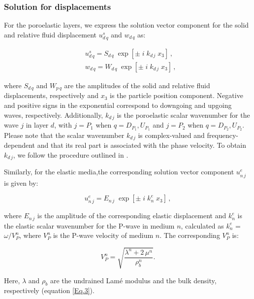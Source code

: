 \documentclass[draft]{agujournal2019}
\begin{document}
\subsubsection{Solution for displacements}
For the poro\-elastic layers, we express the solution vector component for the solid and relative fluid displacement $u_{d\,q}^s$ and $w_{d\, q}$ as:
\begin{linenomath*}
\begin{equation}\label{Eq.10}
\begin{split}
& u_{d\,q}^s = S_{d\, q}\;\exp[ \pm \; i \; k_{d \,j} \; x_3 ] \, ,\\
& w_{d \,q} = W_{d\,q}\;\exp[\pm \; i\;  k_{d\,j} \;x_3 ] \, ,
\end{split}
\end{equation}
\end{linenomath*}
where $ S_{d\, q}$ and $W_{p\,q}$
are the amplitudes of the solid and relative fluid displacements, respectively and $x_3$ is the particle position component. Negative and positive signs in the exponential correspond to downgoing and upgoing waves, respectively. Additionally, 
$ k_{d\,j}$ is the poroelastic scalar wave\-number for the wave $j$ in layer $d$, with $j=P_1$ when $q=D_{P_1},U_{P_1}$ and $j=P_2$ when $q=D_{P_2},U_{P_2}$. Please note that the scalar wave\-number $ k_{d\,j}$ is complex-valued and frequency-dependent and that its real part is associated with the phase velocity. To obtain
$ k_{d\,j}$, we follow the procedure outlined in .

Similarly, for the elastic media,the corresponding solution vector component $u_{n\,j}^e$ is given by:
\begin{linenomath*}
\begin{equation}\label{Eq.11}
u_{n\,j}^e = E_{n \,j} \;\exp[ \pm\; i \; k_{n}^e \; x_3 ]\,,
\end{equation}
\end{linenomath*}
where $E_{n \,j}$ is the amplitude of the corresponding elastic displacement and $ k_{n}^e$ is the elastic scalar wave\-number for the P-wave in medium $n$, calculated as $ k_{n}^e$ = $\omega / V_P^n$, where $V_P^n$ is the P-wave velocity of medium $n$. 
The corresponding $V_P^n$ is:
\begin{linenomath*}
\begin{equation}\label{Eq.12}
V_P^n = \sqrt{\frac{\lambda^n +  2\, \mu^n}{\rho_b^n}} .
\end{equation}
\end{linenomath*}
Here, $\lambda$ and $\rho_b$ are the undrained Lamé modulus and the bulk density, respectively (equation \eqref{Eq.3}).
\end{document}
